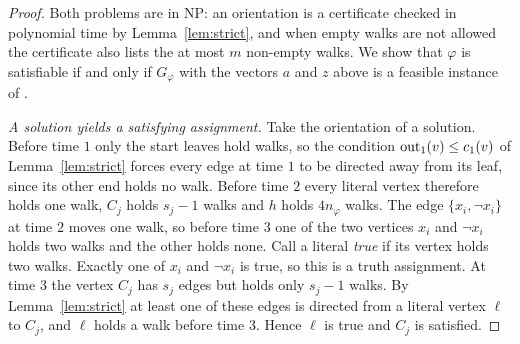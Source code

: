\begin{proof}
Both problems are in NP: an orientation is a certificate checked in polynomial time by Lemma~\ref{lem:strict}, and when empty walks are not allowed the certificate also lists the at most $m$ non-empty walks. We show that $\varphi$ is satisfiable if and only if $G_\varphi$ with the vectors $a$ and $z$ above is a feasible instance of \SFIX{}.

\emph{A solution yields a satisfying assignment.} Take the orientation of a solution. Before time $1$ only the start leaves hold walks, so the condition $\mathrm{out}_1(v)\le c_1(v)$ of Lemma~\ref{lem:strict} forces every edge at time $1$ to be directed away from its leaf, since its other end holds no walk. Before time $2$ every literal vertex therefore holds one walk, $C_j$ holds $s_j-1$ walks and $h$ holds $4n_\varphi$ walks. The edge $\{x_i,\lnot x_i\}$ at time $2$ moves one walk, so before time $3$ one of the two vertices $x_i$ and $\lnot x_i$ holds two walks and the other holds none. Call a literal \emph{true} if its vertex holds two walks. Exactly one of $x_i$ and $\lnot x_i$ is true, so this is a truth assignment. At time $3$ the vertex $C_j$ has $s_j$ edges but holds only $s_j-1$ walks. By Lemma~\ref{lem:strict} at least one of these edges is directed from a literal vertex $\ell$ to $C_j$, and $\ell$ holds a walk before time $3$. Hence $\ell$ is true and $C_j$ is satisfied.


\end{proof}
